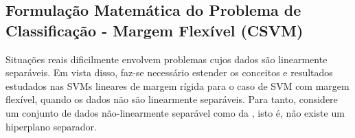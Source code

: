 \documentclass[12pt,a4paper]{scrartcl}
\theoremstyle{definition}%
\begin{document}

\subsection{Formulação Matemática do Problema de Classificação - Margem Flexível (CSVM)}

Situações reais dificilmente envolvem problemas cujos dados são linearmente separáveis. Em vista disso, faz-se necessário estender os conceitos e resultados estudados nas SVMs lineares de margem rígida para o caso de SVM com margem flexível, quando os dados não são linearmente separáveis. Para tanto, considere um conjunto de dados não-linearmente separável como da , isto é, não existe um hiperplano separador. 
\end{document}
